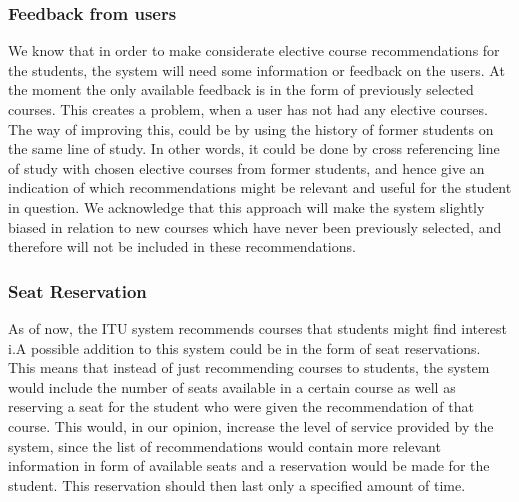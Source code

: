 \subsubsection*{Feedback from users}
We know that in order to make considerate elective course recommendations for the students, the system will need some information or feedback on the users. At the moment the only available feedback is in the form of previously selected courses. This creates a problem, when a user has not had any elective courses.\newline
The way of improving this, could be by using the history of former students on the same line of study. In other words, it could be done by cross referencing line of study with chosen elective courses from former students, and hence give an indication of which recommendations might be relevant and useful for the student in question.\newline
We acknowledge that this approach will make the system slightly biased in relation to new courses which have never been previously selected, and therefore will not be included in these recommendations.

\subsubsection*{Seat Reservation}
As of now, the ITU system recommends courses that students might find interest i.A possible addition to this system could be in the form of seat reservations.\newline 
This means that instead of just recommending courses to students, the system would include the number of seats available in a certain course as well as reserving a seat for the student who were given the recommendation of that course. This would, in our opinion, increase the level of service provided by the system, since the list of recommendations would contain more relevant information in form of available seats and a reservation would be made for the student. This reservation should then last only a specified amount of time.\newline

